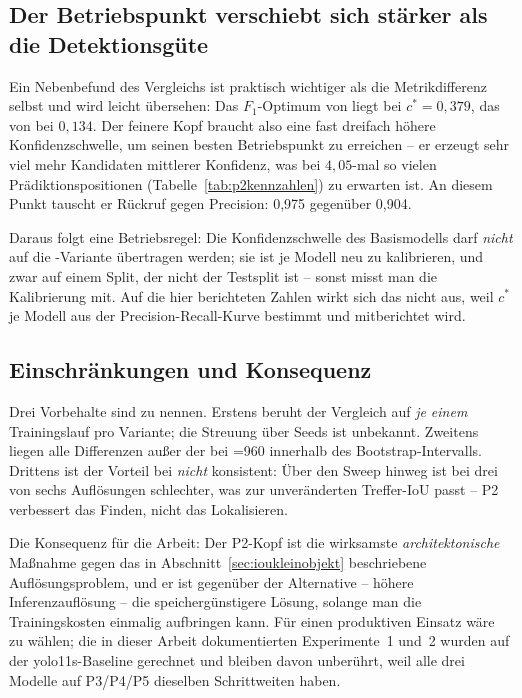 \subsection{Der Betriebspunkt verschiebt sich stärker als die Detektionsgüte}
\label{sec:p2betriebspunkt}

Ein Nebenbefund des Vergleichs ist praktisch wichtiger als die
Metrikdifferenz selbst und wird leicht übersehen: Das $F_1$-Optimum von
 liegt bei $c^* = 0{,}379$, das von  bei
$0{,}134$. Der feinere Kopf braucht also eine fast dreifach höhere
Konfidenzschwelle, um seinen besten Betriebspunkt zu erreichen -- er erzeugt
sehr viel mehr Kandidaten mittlerer Konfidenz, was bei $4{,}05$-mal so vielen
Prädiktionspositionen (Tabelle~\ref{tab:p2kennzahlen}) zu erwarten ist. An
diesem Punkt tauscht er Rückruf gegen Precision: 0,975 gegenüber 0,904.

Daraus folgt eine Betriebsregel: Die Konfidenzschwelle des Basismodells darf
\emph{nicht} auf die -Variante übertragen werden; sie ist je Modell
neu zu kalibrieren, und zwar auf einem Split, der nicht der Testsplit ist --
sonst misst man die Kalibrierung mit. Auf die hier berichteten Zahlen wirkt sich
das nicht aus, weil $c^*$ je Modell aus der Precision-Recall-Kurve bestimmt und
mitberichtet wird.

\subsection{Einschränkungen und Konsequenz}

Drei Vorbehalte sind zu nennen. Erstens beruht der Vergleich auf \emph{je einem}
Trainingslauf pro Variante; die Streuung über Seeds ist unbekannt. Zweitens
liegen alle Differenzen außer der bei =960 innerhalb des
Bootstrap-Intervalls. Drittens ist der Vorteil bei \mAPall{} \emph{nicht}
konsistent: Über den Sweep hinweg ist  bei drei von sechs
Auflösungen schlechter, was zur unveränderten Treffer-IoU passt -- P2 verbessert
das Finden, nicht das Lokalisieren.

Die Konsequenz für die Arbeit: Der P2-Kopf ist die wirksamste
\emph{architektonische} Maßnahme gegen das in
Abschnitt~\ref{sec:ioukleinobjekt} beschriebene Auflösungsproblem, und er ist
gegenüber der Alternative -- höhere Inferenzauflösung -- die
speichergünstigere Lösung, solange man die Trainingskosten einmalig aufbringen
kann. Für einen produktiven Einsatz wäre  zu wählen; die in
dieser Arbeit dokumentierten Experimente~1 und~2 wurden auf der yolo11s-Baseline
gerechnet und bleiben davon unberührt, weil alle drei Modelle auf P3/P4/P5
dieselben Schrittweiten haben.

